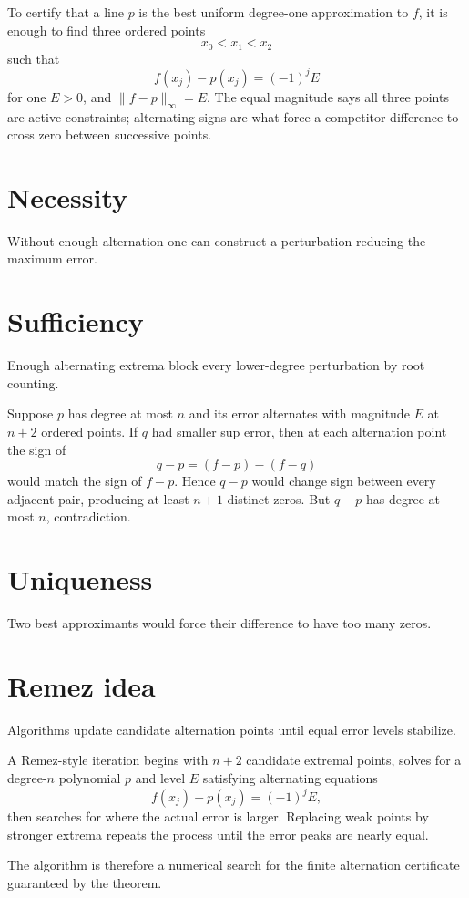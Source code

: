 \begin{example}\label{ex:ii23-expand-01}
To certify that a line \(p\) is the best uniform degree-one approximation to
\(f\), it is enough to find three ordered points
\[
x_0<x_1<x_2
\]
such that
\[
f(x_j)-p(x_j)=(-1)^jE
\]
for one \(E>0\), and \(\|f-p\|_\infty=E\). The equal magnitude says all three
points are active constraints; alternating signs are what force a competitor
difference to cross zero between successive points.
\end{example}
\section{Necessity}
Without enough alternation one can construct a perturbation reducing the maximum error.

\section{Sufficiency}
Enough alternating extrema block every lower-degree perturbation by root counting.


\begin{example}\label{ex:ii23-expand-02}
Suppose \(p\) has degree at most \(n\) and its error alternates with magnitude
\(E\) at \(n+2\) ordered points. If \(q\) had smaller sup error, then at each
alternation point the sign of
\[
q-p=(f-p)-(f-q)
\]
would match the sign of \(f-p\). Hence \(q-p\) would change sign between every
adjacent pair, producing at least \(n+1\) distinct zeros. But \(q-p\) has
degree at most \(n\), contradiction.
\end{example}
\section{Uniqueness}
Two best approximants would force their difference to have too many zeros.

\section{Remez idea}
Algorithms update candidate alternation points until equal error levels stabilize.


\begin{example}\label{ex:ii23-expand-03}
A Remez-style iteration begins with \(n+2\) candidate extremal points, solves
for a degree-\(n\) polynomial \(p\) and level \(E\) satisfying alternating
equations
\[
f(x_j)-p(x_j)=(-1)^jE,
\]
then searches for where the actual error is larger. Replacing weak points by
stronger extrema repeats the process until the error peaks are nearly equal.

The algorithm is therefore a numerical search for the finite alternation
certificate guaranteed by the theorem.
\end{example}
